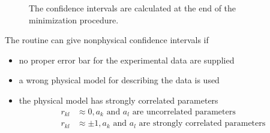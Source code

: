 \begin{figure}[htb]
\begin{center}
\end{center}
\caption{The confidence intervals are calculated at the end of the minimization procedure.}
\label{fig:FitErrors}
\end{figure}

The routine can give nonphysical confidence intervals if
\begin{itemize}
\item no proper error bar for the experimental data are supplied
\item a wrong physical model for describing the data is used
\item the physical model has strongly correlated parameters
\begin{subequations}
\begin{align}
r_{kl} &\approx 0, a_k \mbox{ and } a_l \mbox{ are uncorrelated parameters} \\
r_{kl} &\approx \pm 1, a_k \mbox{ and } a_l \mbox{ are strongly correlated parameters}
\end{align}
\end{subequations}
\end{itemize}

